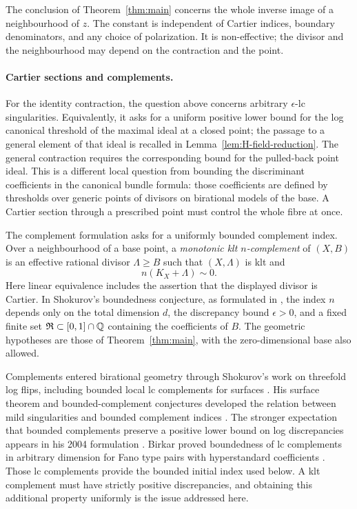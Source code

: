 The conclusion of Theorem~\ref{thm:main} concerns the whole inverse image of a neighbourhood of $z$. The constant is independent of Cartier indices, boundary denominators, and any choice of polarization. It is non-effective; the divisor and the neighbourhood may depend on the contraction and the point.

\paragraph{Cartier sections and complements.}
For the identity contraction, the question above concerns arbitrary $\epsilon$-lc singularities. Equivalently, it asks for a uniform positive lower bound for the log canonical threshold of the maximal ideal at a closed point; the passage to a general element of that ideal is recalled in Lemma~\ref{lem:H-field-reduction}. The general contraction requires the corresponding bound for the pulled-back point ideal. This is a different local question from bounding the discriminant coefficients in the canonical bundle formula: those coefficients are defined by thresholds over generic points of divisors on birational models of the base. A Cartier section through a prescribed point must control the whole fibre at once.

The complement formulation asks for a uniformly bounded complement index. Over a neighbourhood of a base point, a \emph{monotonic klt $n$-complement} of $(X,B)$ is an effective rational divisor $\Lambda\ge B$ such that $(X,\Lambda)$ is klt and
\[
 n(K_X+\Lambda)\sim 0.
\]
Here linear equivalence includes the assertion that the displayed divisor is Cartier. In Shokurov's boundedness conjecture, as formulated in \cite[Conjecture~1.1]{Chen2025}, the index $n$ depends only on the total dimension $d$, the discrepancy bound $\epsilon>0$, and a fixed finite set $\mathfrak R\subset[0,1]\cap\mathbb Q$ containing the coefficients of $B$. The geometric hypotheses are those of Theorem~\ref{thm:main}, with the zero-dimensional base also allowed.

Complements entered birational geometry through Shokurov's work on threefold log flips, including bounded local lc complements for surfaces \cite[Section~5]{ShokurovFlips}. His surface theorem and bounded-complement conjectures developed the relation between mild singularities and bounded complement indices \cite[Conjecture~1.3 and Main Theorem~1.4]{ShokurovSurfaces}. The stronger expectation that bounded complements preserve a positive lower bound on log discrepancies appears in his 2004 formulation \cite{ShokurovBounded2004}. Birkar proved boundedness of lc complements in arbitrary dimension for Fano type pairs with hyperstandard coefficients \cite[Theorems~1.7--1.8]{BirkarComplements}. Those lc complements provide the bounded initial index used below. A klt complement must have strictly positive discrepancies, and obtaining this additional property uniformly is the issue addressed here.

